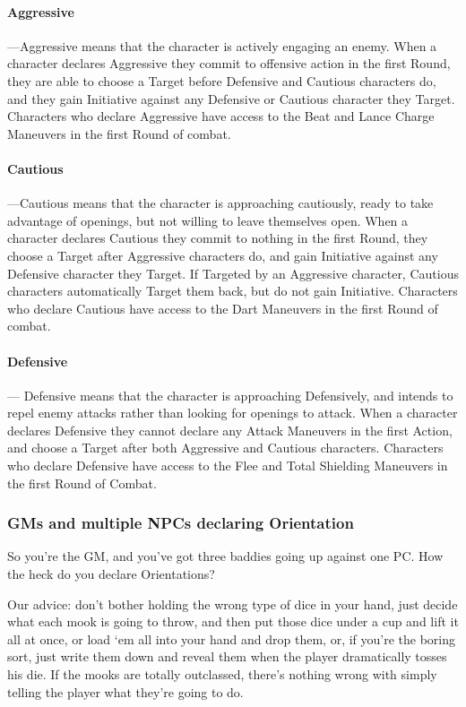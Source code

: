 \documentclass[oneside,11pt,english]{book}
\begin{document}
\paragraph{\label{par:Aggressive}Aggressive}---\quad Aggressive means that the
character is actively engaging an enemy. When a character declares Aggressive
they commit to offensive action in the first Round, they are able to choose a
Target before Defensive and Cautious characters do, and they gain Initiative
against any Defensive or Cautious character they Target. Characters who declare
Aggressive have access to the Beat and Lance Charge Maneuvers in the first Round
of combat.
\paragraph{\label{par:Cautious}Cautious}---\quad Cautious means that the
character is approaching cautiously, ready to take advantage of openings, but
not willing to leave themselves open. When a character declares Cautious they
commit to nothing in the first Round, they choose a Target after Aggressive
characters do, and gain Initiative against any Defensive character they Target.
If Targeted by an Aggressive character, Cautious characters automatically Target
them back, but do not gain Initiative. Characters who declare Cautious have
access to the Dart Maneuvers in the first Round of combat.
\paragraph{\label{par:Defensive}Defensive}---\quad
Defensive means that the character is approaching Defensively, and intends to repel enemy
attacks rather than looking for openings to attack. When a character declares Defensive they
cannot declare any Attack Maneuvers in the first Action, and choose a Target after both
Aggressive and Cautious characters. Characters who declare Defensive have access to the Flee
and Total Shielding Maneuvers in the first Round of Combat.
\subsubsection*{GMs and multiple NPCs declaring Orientation}
So you’re the GM, and you’ve got three baddies going up against one PC. How the heck do you declare
Orientations?

Our advice: don’t bother holding the wrong type of dice in your hand, just decide what each mook is
going to throw, and then put those dice under a cup and lift it all at once, or load ‘em all into your hand
and drop them, or, if you’re the boring sort, just write them down and reveal them when the player
dramatically tosses his die. If the mooks are totally outclassed, there’s nothing wrong with simply telling
the player what they’re going to do.
\end{document}
